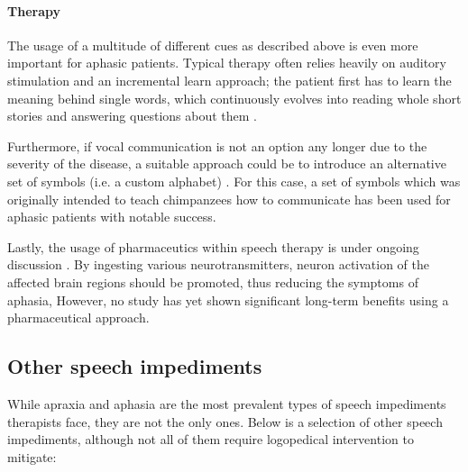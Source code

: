 \documentclass[draft,final]{vutinfth} %
\begin{document}
\paragraph{Therapy} The usage of a multitude of different cues as described above is even more important for aphasic patients. Typical therapy often relies heavily on auditory stimulation and an incremental learn approach; the patient first has to learn the meaning behind single words, which continuously evolves into reading whole short stories and answering questions about them \cite{proestler2023}.


Furthermore, if vocal communication is not an option any longer due to the severity of the disease, a suitable approach could be to introduce an alternative set of symbols (i.e. a custom alphabet) \cite{glass1973artificial}. For this case, a set of symbols which was originally intended to teach chimpanzees how to communicate has  been used for aphasic patients with notable success.

Lastly, the usage of pharmaceutics within speech therapy is under ongoing discussion \cite{raymer2001effects, sabe1995randomized,small1994pharmacotherapy}.
By ingesting various neurotransmitters, neuron activation of the affected brain regions should be promoted, thus reducing the symptoms of aphasia, However, no study has yet shown significant long-term benefits using a pharmaceutical approach.

\subsection{Other speech impediments}
While apraxia and aphasia are the most prevalent types of speech impediments therapists face, they are not the only ones. Below is a selection of other speech impediments, although not all of them require logopedical intervention to mitigate:
\end{document}
